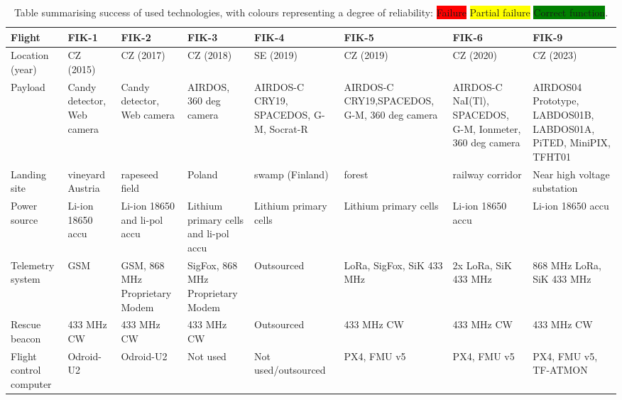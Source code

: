 \documentclass[a4paper,portrait]{article}
\begin{document}
\begin{sidewaystable}
\centering
\caption{Table summarising success of used technologies, with colours representing a degree of reliability: \newline \colorbox{red}{Failure} \colorbox{yellow}{Partial failure} \colorbox{green}{Correct function}.\label{Flight_reliability}}
\begin{adjustbox}{width=\textwidth} %
{\begin{tabular}{>{\centering\arraybackslash}m{} >{\centering\arraybackslash}m{} >{\centering\arraybackslash}m{} >{\centering\arraybackslash}m{} >{\centering\arraybackslash}m{} >{\centering\arraybackslash}m{} >{\centering\arraybackslash}m{} >{\centering\arraybackslash}m{}}\toprule
Flight & FIK-1 & FIK-2 & FIK-3 & FIK-4 & FIK-5 & FIK-6 & FIK-9 \\\midrule
Location (year) & CZ (2015) & CZ (2017) & CZ (2018) & SE (2019) & CZ (2019) & CZ (2020) & CZ (2023) \\
Payload & \cellcolor{green} Candy detector, Web camera & \cellcolor{yellow} Candy detector, Web camera & \cellcolor{green} AIRDOS,
360 deg camera & \cellcolor{green} AIRDOS-C CRY19, SPACEDOS, G-M, Socrat-R & \cellcolor{green} AIRDOS-C
CRY19,SPACEDOS, G-M, 360 deg camera & \cellcolor{green} AIRDOS-C NaI(Tl), SPACEDOS, G-M, Ionmeter, 360 deg camera & \cellcolor{green} AIRDOS04 Prototype, LABDOS01B, LABDOS01A, PiTED, MiniPIX, TFHT01 \\
Landing site & \cellcolor{yellow} vineyard Austria & \cellcolor{green} rapeseed field & \cellcolor{red} Poland & \cellcolor{yellow} swamp (Finland) & \cellcolor{green} forest & \cellcolor{red} railway corridor & \cellcolor{red} Near high voltage substation\\
Power source & \cellcolor{green} Li-ion 18650 accu & \cellcolor{yellow} Li-ion 18650 and li-pol accu & \cellcolor{yellow} Lithium primary cells and li-pol accu & \cellcolor{green} Lithium primary cells & \cellcolor{yellow} Lithium primary cells & \cellcolor{green} Li-ion 18650 accu &  \cellcolor{green} Li-ion 18650 accu \\
Telemetry system & \cellcolor{red} GSM & \cellcolor{yellow} GSM, 868 MHz Proprietary Modem & \cellcolor{yellow} SigFox, 868 MHz Proprietary Modem &  Outsourced & \cellcolor{green} LoRa, SigFox, SiK 433 MHz & \cellcolor{green} 2x LoRa, SiK 433 MHz & \cellcolor{green} 868 MHz LoRa, SiK 433 MHz \\
Rescue beacon & \cellcolor{green} 433 MHz CW & \cellcolor{green} 433 MHz CW & \cellcolor{green} 433 MHz CW &  Outsourced & \cellcolor{green} 433 MHz CW & \cellcolor{green} 433 MHz CW & \cellcolor{green} 433 MHz CW \\
Flight control computer & \cellcolor{yellow} Odroid-U2 & \cellcolor{yellow} Odroid-U2 & Not used & Not used/outsourced & \cellcolor{green} PX4, FMU v5 & \cellcolor{green} PX4, FMU v5 & \cellcolor{green} PX4, FMU v5, TF-ATMON \\
\bottomrule
\end{tabular}}
\end{adjustbox}
\end{sidewaystable}
\end{document}
